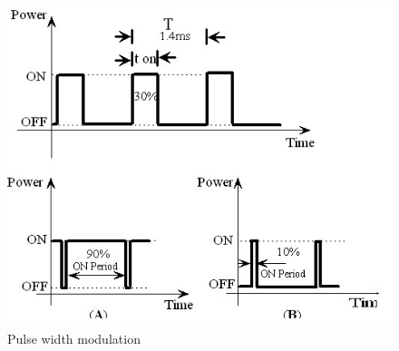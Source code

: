 \documentclass[a4paper,12pt,oneside]{book}
\begin{document}
	\hfill\\
	\begin{figure}[h!]
		\caption{Pulse width modulation}
		\includegraphics[width=\textwidth]{./HardwareManual/pwm.png}
	\end{figure}
\end{document}
